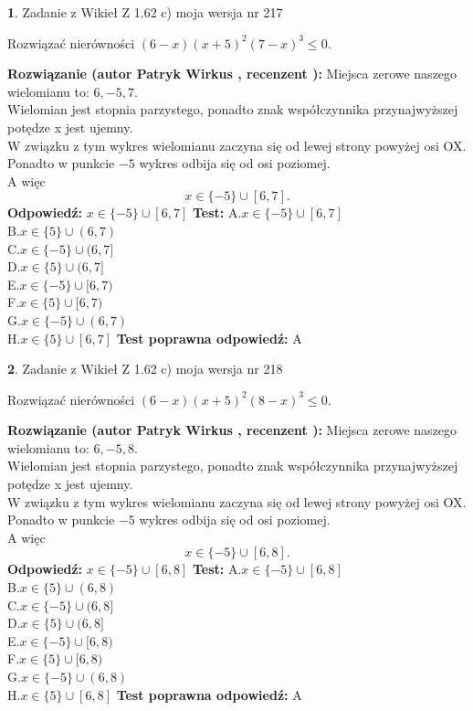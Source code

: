 \documentclass[12pt, a4paper]{article}
\theoremstyle{definition} %
\newtheorem{zad}{}
\newcommand{\zadStart}[1]{\begin{zad}#1\newline}
\newcommand{\zadStop}{\end{zad}}
\newcommand{\rozwStart}[2]{\noindent \textbf{Rozwiązanie (autor #1 , recenzent #2): }\newline}
\newcommand{\rozwStop}{\newline}
\newcommand{\odpStart}{\noindent \textbf{Odpowiedź:}\newline}
\newcommand{\odpStop}{\newline}
\newcommand{\testStart}{\noindent \textbf{Test:}\newline}
\newcommand{\testStop}{\newline}
\newcommand{\kluczStart}{\noindent \textbf{Test poprawna odpowiedź:}\newline}
\newcommand{\kluczStop}{\newline}
\begin{document}
\zadStart{Zadanie z Wikieł Z 1.62 c) moja wersja nr 217}

Rozwiązać nierówności $(6-x)(x+5)^{2}(7-x)^{3}\le0$.
\zadStop
\rozwStart{Patryk Wirkus}{}
Miejsca zerowe naszego wielomianu to: $6, -5, 7$.\\
Wielomian jest stopnia parzystego, ponadto znak współczynnika przy\linebreak najwyższej potędze x jest ujemny.\\ W związku z tym wykres wielomianu zaczyna się od lewej strony powyżej osi OX.\\
Ponadto w punkcie $-5$ wykres odbija się od osi poziomej.\\
A więc $$x \in \{-5\} \cup [6,7].$$
\rozwStop
\odpStart
$x \in \{-5\} \cup [6,7]$
\odpStop
\testStart
A.$x \in \{-5\} \cup [6,7]$\\
B.$x \in \{5\} \cup (6,7)$\\
C.$x \in \{-5\} \cup (6,7]$\\
D.$x \in \{5\} \cup (6,7]$\\
E.$x \in \{-5\} \cup [6,7)$\\
F.$x \in \{5\} \cup [6,7)$\\
G.$x \in \{-5\} \cup (6,7)$\\
H.$x \in \{5\} \cup [6,7]$
\testStop
\kluczStart
A
\kluczStop



\zadStart{Zadanie z Wikieł Z 1.62 c) moja wersja nr 218}

Rozwiązać nierówności $(6-x)(x+5)^{2}(8-x)^{3}\le0$.
\zadStop
\rozwStart{Patryk Wirkus}{}
Miejsca zerowe naszego wielomianu to: $6, -5, 8$.\\
Wielomian jest stopnia parzystego, ponadto znak współczynnika przy\linebreak najwyższej potędze x jest ujemny.\\ W związku z tym wykres wielomianu zaczyna się od lewej strony powyżej osi OX.\\
Ponadto w punkcie $-5$ wykres odbija się od osi poziomej.\\
A więc $$x \in \{-5\} \cup [6,8].$$
\rozwStop
\odpStart
$x \in \{-5\} \cup [6,8]$
\odpStop
\testStart
A.$x \in \{-5\} \cup [6,8]$\\
B.$x \in \{5\} \cup (6,8)$\\
C.$x \in \{-5\} \cup (6,8]$\\
D.$x \in \{5\} \cup (6,8]$\\
E.$x \in \{-5\} \cup [6,8)$\\
F.$x \in \{5\} \cup [6,8)$\\
G.$x \in \{-5\} \cup (6,8)$\\
H.$x \in \{5\} \cup [6,8]$
\testStop
\kluczStart
A
\kluczStop
\end{document}
